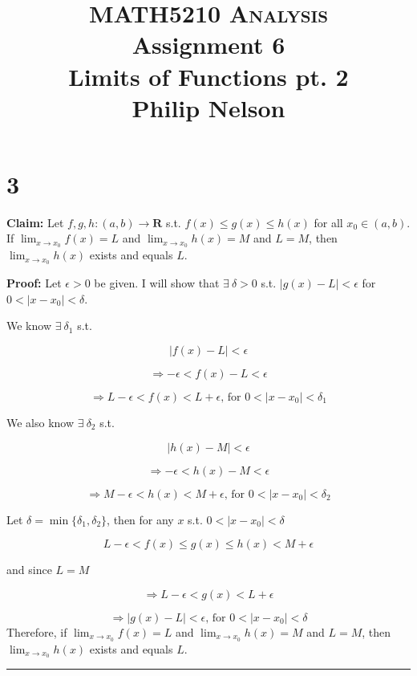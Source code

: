 \documentclass[10pt,letterpaper]{article}
\newcommand\R{\mathbf{R}}
\newcommand\ds{\displaystyle}
\newcommand\qedsym{\hfill \rule{2mm}{2mm}}
\begin{document}
\title{MATH5210 \textsc{Analysis}
  \\ Assignment 6
  \\ Limits of Functions pt. 2
  \\ Philip Nelson
}

\date{}

\maketitle

\section*{3}

\textbf{Claim:} Let $f, g, h:(a, b)\rightarrow\R$ s.t. $f(x) \leq g(x) \leq h(x)$ for all $x_0\in(a, b)$. If $\ds\lim_{x\to x_0} f(x) = L$ and $\ds\lim_{x\to x_0} h(x) = M$ and $L=M$, then $\ds\lim_{x\to x_0} h(x)$ exists and equals $L$.

\medskip

\textbf{Proof:} Let $\epsilon > 0$ be given. I will show that $\exists\ \delta > 0$ s.t. $|g(x) - L| < \epsilon$ for $0 < |x-x_0| < \delta$.

We know $\exists\ \delta_1$ s.t.

\[|f(x)-L|<\epsilon\]

\[\Rightarrow -\epsilon<f(x)-L<\epsilon\]

\[\Rightarrow L-\epsilon<f(x)<L+\epsilon\text{, for } 0<|x-x_0|<\delta_1\]

\medskip
We also know $\exists\ \delta_2$ s.t.

\[|h(x)-M|<\epsilon\]

\[\Rightarrow -\epsilon<h(x)-M<\epsilon\]

\[\Rightarrow M-\epsilon<h(x)<M+\epsilon\text{, for } 0<|x-x_0|<\delta_2\]

\medskip
Let $\delta = \min\{\delta_1, \delta_2\}$, then for any $x$ s.t. $0 < |x-x_0| < \delta$

\[L-\epsilon < f(x) \leq g(x) \leq h(x) < M+\epsilon\] 

and since $L=M$

\[\Rightarrow L-\epsilon < g(x) < L+\epsilon\] 

\[\Rightarrow |g(x) - L| < \epsilon\text{, for }0<|x-x_0|<\delta\]
Therefore, if $\ds\lim_{x\to x_0} f(x) = L$ and $\ds\lim_{x\to x_0} h(x) = M$ and $L=M$, then $\ds\lim_{x\to x_0} h(x)$ exists and equals $L$.

\qedsym
\end{document}
